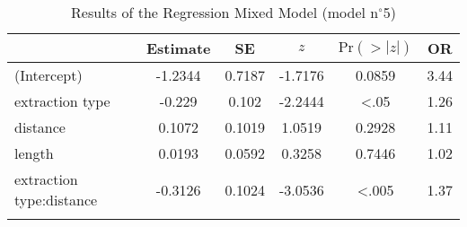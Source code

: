 \begin{table}
\begin{tabular}{l S[table-format=-1.4] S[table-format=1.4] S[table-format=-1.4] S[table-format=<1.4] S[table-format=2.2]}
  \lsptoprule
 & {Estimate} & {SE} & {$z$} & {$\text{Pr}(>|z|)$} & {OR} \\ 
  \midrule
(Intercept) & -1.2344 & 0.7187 & -1.7176 & 0.0859 & 3.44 \\ 
  extraction type & -0.229 & 0.102 & -2.2444 & <.05 & 1.26 \\ 
  distance & 0.1072 & 0.1019 & 1.0519 & 0.2928 & 1.11 \\ 
  length & 0.0193 & 0.0592 & 0.3258 & 0.7446 & 1.02 \\ 
  extraction type:distance & -0.3126 & 0.1024 & -3.0536 & <.005 & 1.37 \\ 
   \lspbottomrule
\end{tabular}
\caption{Results of the Regression Mixed Model (model n$^{\circ}$5)}
\label{tab:exp03-m5}
\end{table}
